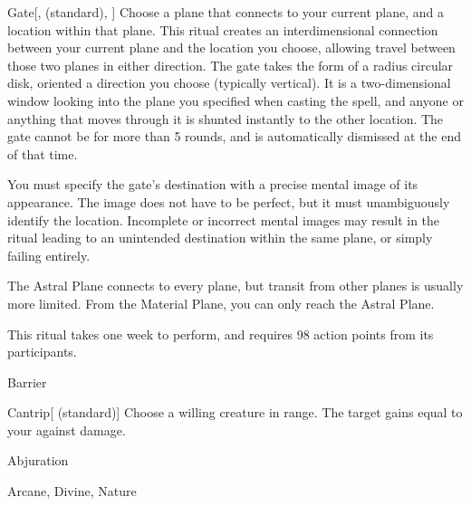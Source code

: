 \begin{ability}[\nth{7}]{Gate}[,  (standard), ]
Choose a plane that connects to your current plane, and a location within that plane.
This ritual creates an interdimensional connection between your current plane and the location you choose, allowing travel between those two planes in either direction.
The gate takes the form of a \areasmall radius circular disk, oriented a direction you choose (typically vertical).
It is a two-dimensional window looking into the plane you specified when casting the spell, and anyone or anything that moves through it is shunted instantly to the other location.
The gate cannot be  for more than 5 rounds, and is automatically dismissed at the end of that time.

You must specify the gate's destination with a precise mental image of its appearance.
The image does not have to be perfect, but it must unambiguously identify the location.
Incomplete or incorrect mental images may result in the ritual leading to an unintended destination within the same plane, or simply failing entirely.

The Astral Plane connects to every plane, but transit from other planes is usually more limited.
From the Material Plane, you can only reach the Astral Plane.

This ritual takes one week to perform, and requires 98 action points from its participants.
\end{ability}
\vspace{0.25em}


\newpage
\begin{spellsection}{Barrier}

\begin{spellheader}
\end{spellheader}


\begin{ability}{Cantrip}[ (standard)]
Choose a willing creature in \rngclose range.
The target gains  equal to your  against  damage.
\end{ability}




 Abjuration

 Arcane, Divine, Nature
\end{spellsection}


